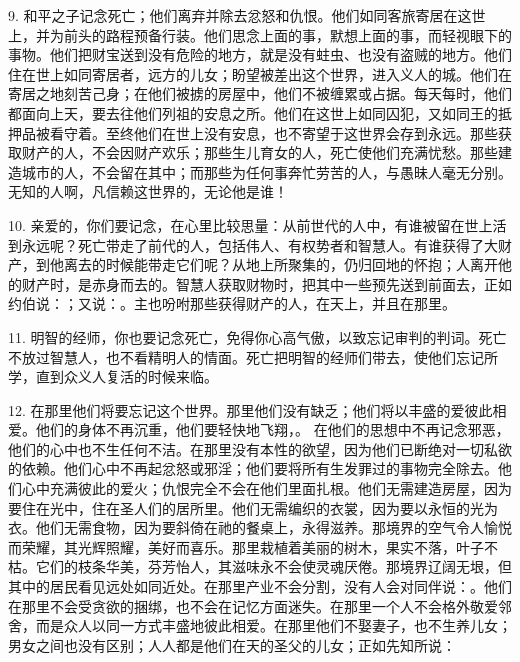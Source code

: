9. 和平之子记念死亡；他们离弃并除去忿怒和仇恨。他们如同客旅寄居在这世上，并为前头的路程预备行装。他们思念上面的事，默想上面的事，而轻视眼下的事物。他们把财宝送到没有危险的地方，就是没有蛀虫、也没有盗贼的地方。他们住在世上如同寄居者，远方的儿女；盼望被差出这个世界，进入义人的城。他们在寄居之地刻苦己身；在他们被掳的房屋中，他们不被缠累或占据。每天每时，他们都面向上天，要去往他们列祖的安息之所。他们在这世上如同囚犯，又如同王的抵押品被看守着。至终他们在世上没有安息，也不寄望于这世界会存到永远。那些获取财产的人，不会因财产欢乐；那些生儿育女的人，死亡使他们充满忧愁。那些建造城市的人，不会留在其中；而那些为任何事奔忙劳苦的人，与愚昧人毫无分别。无知的人啊，凡信赖这世界的，无论他是谁！\par

10. 亲爱的，你们要记念，在心里比较思量：从前世代的人中，有谁被留在世上活到永远呢？死亡带走了前代的人，包括伟人、有权势者和智慧人。有谁获得了大财产，到他离去的时候能带走它们呢？从地上所聚集的，仍归回地的怀抱；人离开他的财产时，是赤身而去的。智慧人获取财物时，把其中一些预先送到前面去，正如约伯说：；又说：。主也吩咐那些获得财产的人，在天上，并且在那里。\par

11. 明智的经师，你也要记念死亡，免得你心高气傲，以致忘记审判的判词。死亡不放过智慧人，也不看精明人的情面。死亡把明智的经师们带去，使他们忘记所学，直到众义人复活的时候来临。\par

12. 在那里他们将要忘记这个世界。那里他们没有缺乏；他们将以丰盛的爱彼此相爱。他们的身体不再沉重，他们要轻快地飞翔，。 在他们的思想中不再记念邪恶，他们的心中也不生任何不洁。在那里没有本性的欲望，因为他们已断绝对一切私欲的依赖。他们心中不再起忿怒或邪淫；他们要将所有生发罪过的事物完全除去。他们心中充满彼此的爱火；仇恨完全不会在他们里面扎根。他们无需建造房屋，因为要住在光中，住在圣人们的居所里。他们无需编织的衣裳，因为要以永恒的光为衣。他们无需食物，因为要斜倚在祂的餐桌上，永得滋养。那境界的空气令人愉悦而荣耀，其光辉照耀，美好而喜乐。那里栽植着美丽的树木，果实不落，叶子不枯。它们的枝条华美，芬芳怡人，其滋味永不会使灵魂厌倦。那境界辽阔无垠，但其中的居民看见远处如同近处。在那里产业不会分割，没有人会对同伴说：。他们在那里不会受贪欲的捆绑，也不会在记忆方面迷失。在那里一个人不会格外敬爱邻舍，而是众人以同一方式丰盛地彼此相爱。在那里他们不娶妻子，也不生养儿女；男女之间也没有区别；人人都是他们在天的圣父的儿女；正如先知所说：\par

